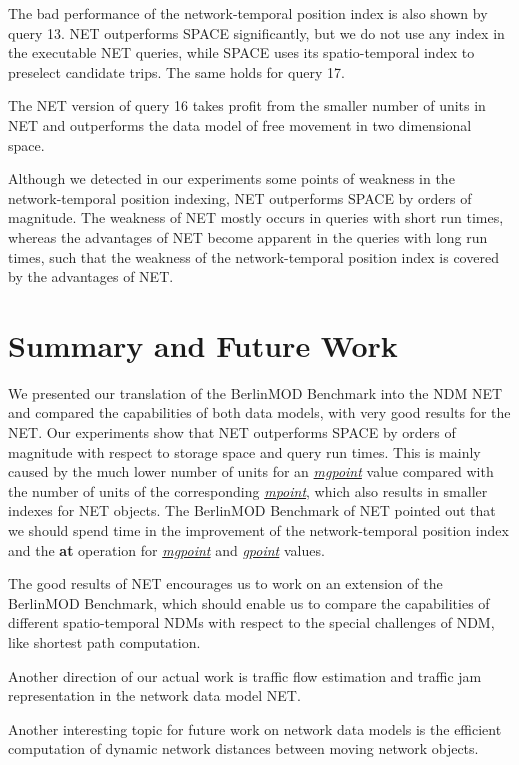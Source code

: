 \documentclass[a4paper]{article}
\newcommand{\bmodb} {BerlinMOD Benchmark}
\newcommand{\op}[1]{\textbf{#1}}
\newcommand{\dt}[1]{\textsl{\underline{#1}}}
\begin{document}
The bad performance of the network-temporal position index is also shown by query 13.
NET outperforms SPACE significantly, but we do not use any index in the
executable NET queries, while SPACE uses its spatio-temporal index to preselect
candidate trips. The same holds for query 17.

The NET version of query 16 takes profit from the smaller number
of units in NET and outperforms the data model of free movement
in two dimensional space.

Although we detected in our experiments some points of weakness in the network-temporal
position indexing, NET outperforms SPACE by orders of magnitude. The weakness
of NET mostly occurs in queries with short run times, whereas the advantages
of NET become apparent in the queries with long run times, such that the weakness
of the network-temporal position index is covered by the advantages of NET.
\section{Summary and Future Work}
\label{sec:summary}
We presented our translation of the \bmodb{} into the NDM NET and
compared the capabilities of both data models, with very good results for the
NET. Our experiments show that NET outperforms
SPACE by orders of magnitude with respect to storage space and query run times.
This is mainly caused by the much lower number of units for an \dt{mgpoint} value
compared with the number of units of the corresponding \dt{mpoint}, which also
results in smaller indexes for NET objects. The \bmodb{} of NET pointed out
that we should spend time in the improvement of the network-temporal position index
and the \op{at} operation for \dt{mgpoint} and \dt{gpoint} values.

The good results of NET encourages us to work on an extension
of the \bmodb{}, which should enable us to compare the capabilities of different
spatio-temporal NDMs with respect to the special challenges of
NDM, like shortest path computation.

Another direction of our actual work is traffic flow estimation and traffic jam
representation in the network data model NET.

Another interesting topic for future work on network data models is the efficient
computation of dynamic network distances between moving network objects.
{}

\appendix
\end{document}

